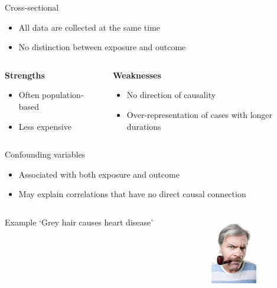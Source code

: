 \begin{frame}[t]{Cross-sectional}
    \begin{itemize}
        \item All data are collected \alert{at the same time}
        \item No distinction between exposure and outcome
    \end{itemize}
    \vfill
    \begin{columns}[t]
        \begin{column}{0.5\textwidth}
            \begin{center}
                \textbf{Strengths}
            \end{center}
            \begin{itemize}
                \item Often population\hyp{}based
                \item Less expensive
            \end{itemize}
        \end{column}
        \begin{column}{0.5\textwidth}
            \begin{center}
                \textbf{Weaknesses}
            \end{center}
            \begin{itemize}
                \item No direction of causality
                \item Over\hyp{}representation of cases with longer durations
            \end{itemize}
        \end{column}
    \end{columns}
\end{frame}

\begin{frame}{Confounding variables}
    \begin{itemize}
        \item \alert{Associated with both exposure and outcome}
        \item May explain correlations that have no direct causal connection
    \end{itemize}
    \vfill\pause
    \begin{columns}[c]
        \begin{column}{0.75\textwidth}
            \begin{block}{Example}
                `Grey hair causes heart disease'
            \end{block}
        \end{column}
        \begin{column}{0.25\textwidth}
            \includegraphics[height=3cm]{figures/gray_hair}
        \end{column}
    \end{columns}
\end{frame}

